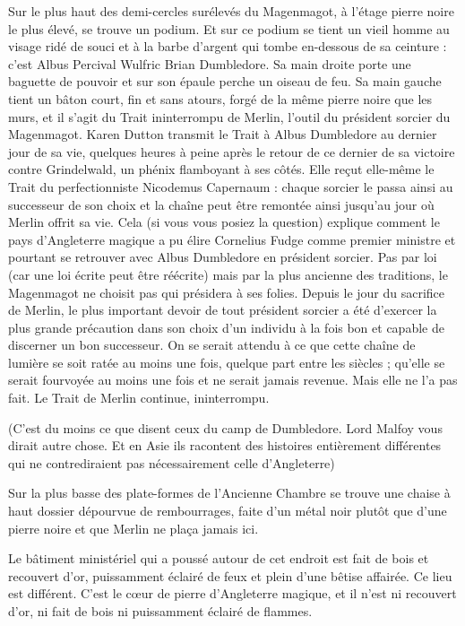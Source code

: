 Sur le plus haut des demi-cercles surélevés du Magenmagot, à l'étage pierre noire le plus élevé, se trouve un podium. Et sur ce podium se tient un vieil homme au visage ridé de souci et à la barbe d'argent qui tombe en-dessous de sa ceinture : c'est Albus Percival Wulfric Brian Dumbledore. Sa main droite porte une baguette de pouvoir et sur son épaule perche un oiseau de feu. Sa main gauche tient un bâton court, fin et sans atours, forgé de la même pierre noire que les murs, et il s'agit du Trait ininterrompu de Merlin, l'outil du président sorcier du Magenmagot. Karen Dutton transmit le Trait à Albus Dumbledore au dernier jour de sa vie, quelques heures à peine après le retour de ce dernier de sa victoire contre Grindelwald, un phénix flamboyant à ses côtés. Elle reçut elle-même le Trait du perfectionniste Nicodemus Capernaum : chaque sorcier le passa ainsi au successeur de son choix et la chaîne peut être remontée ainsi jusqu'au jour où Merlin offrit sa vie. Cela (si vous vous posiez la question) explique comment le pays d'Angleterre magique a pu élire Cornelius Fudge comme premier ministre et pourtant se retrouver avec Albus Dumbledore en président sorcier. Pas par loi (car une loi écrite peut être réécrite) mais par la plus ancienne des traditions, le Magenmagot ne choisit pas qui présidera à ses folies. Depuis le jour du sacrifice de Merlin, le plus important devoir de tout président sorcier a été d'exercer la plus grande précaution dans son choix d'un individu à la fois bon et capable de discerner un bon successeur. On se serait attendu à ce que cette chaîne de lumière se soit ratée au moins une fois, quelque part entre les siècles ; qu'elle se serait fourvoyée au moins une fois et ne serait jamais revenue. Mais elle ne l'a pas fait. Le Trait de Merlin continue, ininterrompu.

(C'est du moins ce que disent ceux du camp de Dumbledore. Lord Malfoy vous dirait autre chose. Et en Asie ils racontent des histoires entièrement différentes qui ne contrediraient pas nécessairement celle d'Angleterre)

Sur la plus basse des plate-formes de l'Ancienne Chambre se trouve une chaise à haut dossier dépourvue de rembourrages, faite d'un métal noir plutôt que d'une pierre noire et que Merlin ne plaça jamais ici.

Le bâtiment ministériel qui a poussé autour de cet endroit est fait de bois et recouvert d'or, puissamment éclairé de feux et plein d'une bêtise affairée. Ce lieu est différent. C'est le cœur de pierre d'Angleterre magique, et il n'est ni recouvert d'or, ni fait de bois ni puissamment éclairé de flammes.

